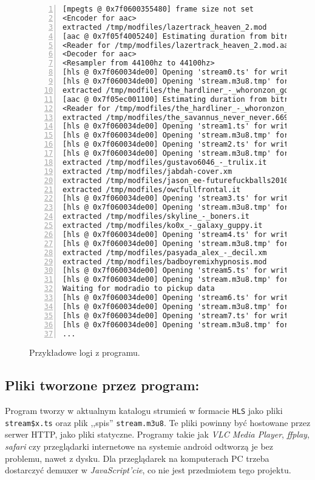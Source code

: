 \documentclass[a4paper,12pt]{article}
\begin{document}
\begin{figure}[h]
\begin{lstlisting}[frame=LB,basicstyle=\ttfamily\scriptsize, numbers=left]
[mpegts @ 0x7f0600355480] frame size not set
<Encoder for aac>
extracted /tmp/modfiles/lazertrack_heaven_2.mod
[aac @ 0x7f05f4005240] Estimating duration from bitrate, this may be inaccurate
<Reader for /tmp/modfiles/lazertrack_heaven_2.mod.aac>
<Decoder for aac>
<Resampler from 44100hz to 44100hz>
[hls @ 0x7f060034de00] Opening 'stream0.ts' for writing
[hls @ 0x7f060034de00] Opening 'stream.m3u8.tmp' for writing
extracted /tmp/modfiles/the_hardliner_-_whoronzon_gohonzon.xm
[aac @ 0x7f05ec001100] Estimating duration from bitrate, this may be inaccurate
<Reader for /tmp/modfiles/the_hardliner_-_whoronzon_gohonzon.xm.aac>
extracted /tmp/modfiles/the_savannus_never_never.669
[hls @ 0x7f060034de00] Opening 'stream1.ts' for writing
[hls @ 0x7f060034de00] Opening 'stream.m3u8.tmp' for writing
[hls @ 0x7f060034de00] Opening 'stream2.ts' for writing
[hls @ 0x7f060034de00] Opening 'stream.m3u8.tmp' for writing
extracted /tmp/modfiles/gustavo6046_-_trulix.it
extracted /tmp/modfiles/jabdah-cover.xm
extracted /tmp/modfiles/jason_ee-futurefuckballs2010_cover.it
extracted /tmp/modfiles/owcfullfrontal.it
[hls @ 0x7f060034de00] Opening 'stream3.ts' for writing
[hls @ 0x7f060034de00] Opening 'stream.m3u8.tmp' for writing
extracted /tmp/modfiles/skyline_-_boners.it
extracted /tmp/modfiles/ko0x_-_galaxy_guppy.it
[hls @ 0x7f060034de00] Opening 'stream4.ts' for writing
[hls @ 0x7f060034de00] Opening 'stream.m3u8.tmp' for writing
extracted /tmp/modfiles/pasyada_alex_-_decil.xm
extracted /tmp/modfiles/badboyremixhypnosis.mod
[hls @ 0x7f060034de00] Opening 'stream5.ts' for writing
[hls @ 0x7f060034de00] Opening 'stream.m3u8.tmp' for writing
Waiting for modradio to pickup data
[hls @ 0x7f060034de00] Opening 'stream6.ts' for writing
[hls @ 0x7f060034de00] Opening 'stream.m3u8.tmp' for writing
[hls @ 0x7f060034de00] Opening 'stream7.ts' for writing
[hls @ 0x7f060034de00] Opening 'stream.m3u8.tmp' for writing
...
\end{lstlisting}
\centering
    \caption{Przykładowe logi z programu.}
    \label{lst:logs}
\end{figure}

\subsection*{Pliki tworzone przez program:}

Program tworzy w aktualnym katalogu strumień w formacie \texttt{HLS} jako pliki
\texttt{stream\$x.ts} oraz plik ,,spis'' \texttt{stream.m3u8}. Te pliki powinny
być hostowane przez serwer HTTP, jako pliki statyczne. Programy takie jak
\emph{VLC Media Player}, \emph{ffplay}, \emph{safari} czy przeglądarki
internetowe na systemie android odtworzą je bez problemu, nawet z dysku. Dla
przeglądarek na komputerach PC trzeba dostarczyć demuxer w
\emph{JavaScript'cie}, co nie jest przedmiotem tego projektu.
\end{document}

